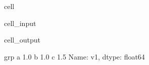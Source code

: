 \documentclass[letterpaper,10pt,english]{jupyterBook}
\begin{document}
\begin{sphinxuseclass}{cell}\begin{sphinxVerbatimInput}

\begin{sphinxuseclass}{cell_input}
\begin{sphinxVerbatim}[commandchars=\\\{\}]
\PYG{p}{[}\PYG{p}{]}    
\end{sphinxVerbatim}

\end{sphinxuseclass}\end{sphinxVerbatimInput}
\begin{sphinxVerbatimOutput}

\begin{sphinxuseclass}{cell_output}
\begin{sphinxVerbatim}[commandchars=\\\{\}]
grp
a    1.0
b    1.0
c    1.5
Name: v1, dtype: float64
\end{sphinxVerbatim}

\end{sphinxuseclass}\end{sphinxVerbatimOutput}

\end{sphinxuseclass}
\end{document}
